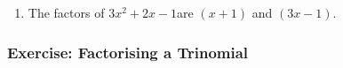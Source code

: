 {\begin{mdframed}[linewidth=4, leftmargin=40, rightmargin=40]
\begin{exercise}
\begin{enumerate}[noitemsep, label=\textbf{Step} \textbf{\arabic*}. ]
{\begin{minipage}{\columnwidth}
    \parbox[t]{48pt}{\raggedleft 
    (8.29)}
    \end{minipage}\vspace{12pt}\par
    }%
        \item  
        \label{m39394*id277481}The factors of $3{x}^{2}+2x-1$\hspace{1ex}are $\left(x+1\right)$ and $\left(3x-1\right)$.
 \par 
        \end{enumerate}
    \end{exercise}
    \end{mdframed}
    }
    \noindent
\label{m39394*secfhsst!!!underscore!!!id2756}
            \subsubsection{Exercise:  Factorising a Trinomial }
            \nopagebreak
